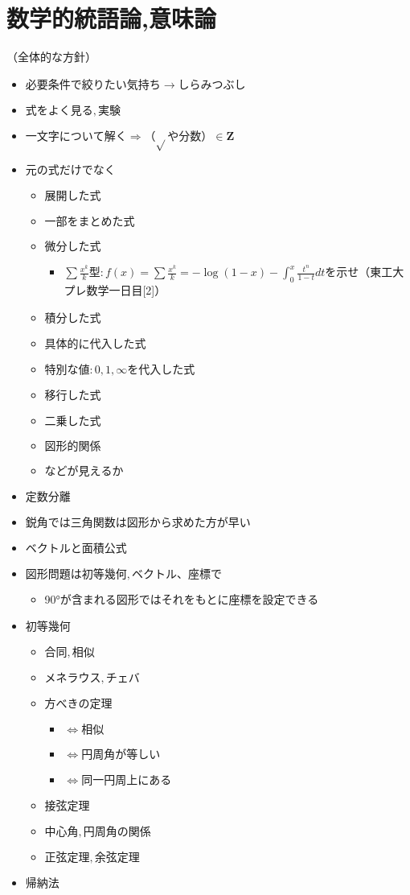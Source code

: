\documentclass[dvipdfmx,uplatex]{jsarticle}
\begin{document}
\section{数学的統語論,意味論}
（全体的な方針）
\begin{itemize}
	\item $必要条件で絞りたい気持ち→しらみつぶし$
	\item $式をよく見る,実験$
	\item $一文字について解く\Rightarrow（\sqrt{}や分数）\in \bm{Z}$
	\item $元の式だけでなく$
	\begin{itemize}
		\item $展開した式$
		\item $一部をまとめた式$
		\item $微分した式$
		\begin{itemize}
			\item $\sum \frac{x^k}{k}型:f(x)=\sum \frac{x^k}{k}=-\log (1-x) - \int^x_0 \frac{t^n}{1-t}dt$を示せ（東工大プレ数学一日目[2]）
		\end{itemize}
		\item $積分した式$
		\item $具体的に代入した式$
		\item $特別な値:0,1, \infty を代入した式$
		\item $移行した式$
		\item $二乗した式$
		\item $図形的関係$
		\item $などが見えるか$
	\end{itemize}
	\item $定数分離$
	\item $鋭角では三角関数は図形から求めた方が早い$
	\item $ベクトルと面積公式$
	\item $図形問題は初等幾何,ベクトル、座標で$
	\begin{itemize}
		\item 90°が含まれる図形ではそれをもとに座標を設定できる
	\end{itemize}
	\item $初等幾何$
	\begin{itemize}
		\item $合同,相似$
		\item $メネラウス,チェバ$
		\item $方べきの定理$
		\begin{itemize}
			\item $ \Leftrightarrow 相似$
			\item $ \Leftrightarrow 円周角が等しい$
			\item $ \Leftrightarrow 同一円周上にある$
		\end{itemize}
		\item $接弦定理$
		\item $中心角,円周角の関係$
		\item $正弦定理,余弦定理$
	\end{itemize}
	\item $帰納法$
\end{itemize}
\end{document}
